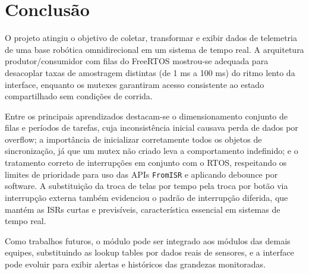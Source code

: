 \documentclass[a4paper,10pt]{article}
\begin{document}
\section{Conclusão}

O projeto atingiu o objetivo de coletar, transformar e exibir dados de telemetria de uma base robótica omnidirecional em um sistema de tempo real. A arquitetura produtor/consumidor com filas do FreeRTOS mostrou-se adequada para desacoplar taxas de amostragem distintas (de 1 ms a 100 ms) do ritmo lento da interface, enquanto os mutexes garantiram acesso consistente ao estado compartilhado sem condições de corrida.

Entre os principais aprendizados destacam-se o dimensionamento conjunto de filas e períodos de tarefas, cuja inconsistência inicial causava perda de dados por overflow; a importância de inicializar corretamente todos os objetos de sincronização, já que um mutex não criado leva a comportamento indefinido; e o tratamento correto de interrupções em conjunto com o RTOS, respeitando os limites de prioridade para uso das APIs \texttt{FromISR} e aplicando debounce por software. A substituição da troca de telas por tempo pela troca por botão via interrupção externa também evidenciou o padrão de interrupção diferida, que mantém as ISRs curtas e previsíveis, característica essencial em sistemas de tempo real.

Como trabalhos futuros, o módulo pode ser integrado aos módulos das demais equipes, substituindo as lookup tables por dados reais de sensores, e a interface pode evoluir para exibir alertas e históricos das grandezas monitoradas.

\clearpage
\end{document}
